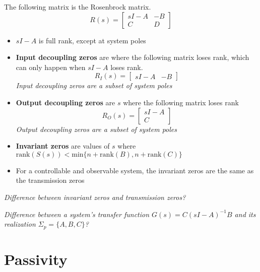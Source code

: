 The following matrix is the Rosenbrock matrix.
\begin{equation*}
  R(s)=
  \begin{bmatrix}
    sI-A & -B \\
    C & D
  \end{bmatrix}
\end{equation*}

\begin{itemize}
  \item{$sI-A$ is full rank, except at system poles}
  \item{\textbf{Input decoupling zeros} are where the following matrix loses rank, which can only happen when $sI-A$ loses rank.}
  \begin{equation*}
    R_{I}(s)=\begin{bmatrix} sI-A & -B \end{bmatrix}
  \end{equation*}
  \textit{Input decoupling zeros are a subset of system poles}
  \item{\textbf{Output decoupling zeros} are $s$ where the following matrix loses rank}
  \begin{equation*}
    R_{O}(s)=\begin{bmatrix} sI-A \\ C \end{bmatrix}
  \end{equation*}
  \textit{Output decoupling zeros are a subset of system poles}
  \item{\textbf{Invariant zeros} are values of $s$ where $\text{rank}(S(s))<\text{min}\{n+\text{rank}(B),n+\text{rank}(C)\}$}
  \item{For a controllable and observable system, the invariant zeros are the same as the transmission zeros}
\end{itemize}

\textit{Difference between invariant zeros and transmission zeros?}

\textit{Difference between a system's transfer function $G(s)=C(sI-A)^{-1}B$ and its realization $\Sigma_{p}=\{A,B,C\}$?}

\chapter{Passivity}


